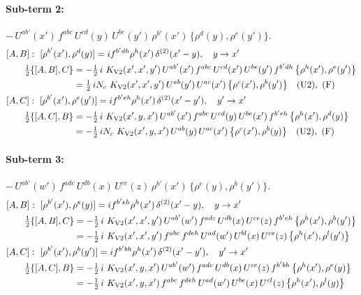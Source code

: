 \documentclass[10pt]{article}
\numberwithin{equation}{section}
\begin{document}
\paragraph{Sub-term 2:} $-\,U^{ab'}(x')\,f^{abc}\,U^{cd}(y)\,U^{be}(y')\,\rho^{b'}(x')\,\big\{\rho^{d}(y),\rho^{e}(y')\big\}$.
\begin{align}
&[A,B]:\ [\rho^{b'}(x'),\rho^{d}(y)]=i f^{b'dh}\rho^{h}(x')\,\delta^{(2)}(x'-y),\quad y\to x'\notag\\
&\qquad \tfrac12\{[A,B],C\}=-\tfrac12\,i\,\,K_{\rm V2}(x',x',y')\,U^{ab'}(x')\,f^{abc}\,U^{cd}(x')\,U^{be}(y')\,f^{b'dh}\,\big\{\rho^{h}(x'),\rho^{e}(y')\big\}\notag\\
&\qquad\phantom{\tfrac12\{[A,B],C\}}=\tfrac12\,i N_{c}\,\,K_{\rm V2}(x',x',y')\,U^{ab}(y')\,U^{ac}(x')\,\big\{\rho^{c}(x'),\rho^{b}(y')\big\}\quad\text{(U2)},\ \text{(F)}
\label{R:eq:GI.V2-2-AB}\\
&[A,C]:\ [\rho^{b'}(x'),\rho^{e}(y')]=i f^{b'eh}\rho^{h}(x')\,\delta^{(2)}(x'-y'),\quad y'\to x'\notag\\
&\qquad \tfrac12\{[A,C],B\}=-\tfrac12\,i\,\,K_{\rm V2}(x',y,x')\,U^{ab'}(x')\,f^{abc}\,U^{cd}(y)\,U^{be}(x')\,f^{b'eh}\,\big\{\rho^{h}(x'),\rho^{d}(y)\big\}\notag\\
&\qquad\phantom{\tfrac12\{[A,C],B\}}=-\tfrac12\,i N_{c}\,\,K_{\rm V2}(x',y,x')\,U^{ab}(y)\,U^{ac}(x')\,\big\{\rho^{c}(x'),\rho^{b}(y)\big\}\quad\text{(U2)},\ \text{(F)}
\label{R:eq:GI.V2-2-AC}
\end{align}
\paragraph{Sub-term 3:} $-\,U^{ab'}(w')\,f^{adc}\,U^{db}(x)\,U^{ce}(z)\,\rho^{b'}(x')\,\big\{\rho^{e}(y),\rho^{b}(y')\big\}$.
\begin{align}
&[A,B]:\ [\rho^{b'}(x'),\rho^{e}(y)]=i f^{b'eh}\rho^{h}(x')\,\delta^{(2)}(x'-y),\quad y\to x'\notag\\
&\qquad \tfrac12\{[A,B],C\}=-\tfrac12\,i\,\,K_{\rm V2}(x',x',y')\,U^{ab'}(w')\,f^{adc}\,U^{db}(x)\,U^{ce}(z)\,f^{b'eh}\,\big\{\rho^{h}(x'),\rho^{b}(y')\big\}\notag\\
&\qquad\phantom{\tfrac12\{[A,B],C\}}=-\tfrac12\,i\,\,K_{\rm V2}(x',x',y')\,f^{abc}\,f^{deh}\,U^{ad}(w')\,U^{bl}(x)\,U^{ce}(z)\,\big\{\rho^{h}(x'),\rho^{l}(y')\big\}
\label{R:eq:GI.V2-3-AB}\\
&[A,C]:\ [\rho^{b'}(x'),\rho^{b}(y')]=i f^{b'bh}\rho^{h}(x')\,\delta^{(2)}(x'-y'),\quad y'\to x'\notag\\
&\qquad \tfrac12\{[A,C],B\}=-\tfrac12\,i\,\,K_{\rm V2}(x',y,x')\,U^{ab'}(w')\,f^{adc}\,U^{db}(x)\,U^{ce}(z)\,f^{b'bh}\,\big\{\rho^{h}(x'),\rho^{e}(y)\big\}\notag\\
&\qquad\phantom{\tfrac12\{[A,C],B\}}=-\tfrac12\,i\,\,K_{\rm V2}(x',y,x')\,f^{abc}\,f^{deh}\,U^{ad}(w')\,U^{be}(x)\,U^{cl}(z)\,\big\{\rho^{h}(x'),\rho^{l}(y)\big\}
\label{R:eq:GI.V2-3-AC}
\end{align}
\end{document}
